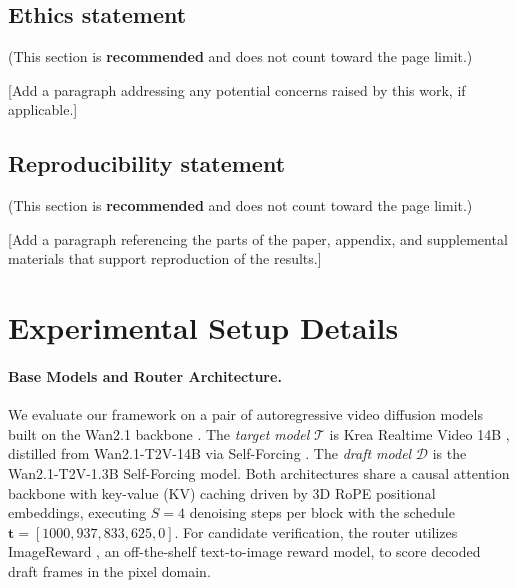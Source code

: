 \documentclass{article} %
\begin{document}
\subsection*{Ethics statement}

(This section is \textbf{recommended} and does not count toward the page limit.)

[Add a paragraph addressing any potential concerns raised by this work, if
applicable.]

\subsection*{Reproducibility statement}

(This section is \textbf{recommended} and does not count toward the page limit.)

[Add a paragraph referencing the parts of the paper, appendix, and supplemental
materials that support reproduction of the results.]
\fi






\clearpage
\appendix

\section{Experimental Setup Details}
\label{app:setup}

\paragraph{Base Models and Router Architecture.}
We evaluate our framework on a pair of autoregressive video diffusion models built on the Wan2.1 backbone \citep{wan2025wanopenadvancedlargescale}. The \emph{target model} $\mathcal{T}$ is Krea Realtime Video 14B \citep{krea_realtime_14b}, distilled from Wan2.1-T2V-14B via Self-Forcing \citep{huang2025selfforcingbridgingtraintest}. The \emph{draft model} $\mathcal{D}$ is the Wan2.1-T2V-1.3B Self-Forcing model. Both architectures share a causal attention backbone with key-value (KV) caching driven by 3D RoPE positional embeddings, executing $S=4$ denoising steps per block with the schedule $\mathbf{t} = [1000, 937, 833, 625, 0]$. For candidate verification, the router utilizes ImageReward \citep{xu2023imagerewardlearningevaluatinghuman}, an off-the-shelf text-to-image reward model, to score decoded draft frames in the pixel domain.
\end{document}
